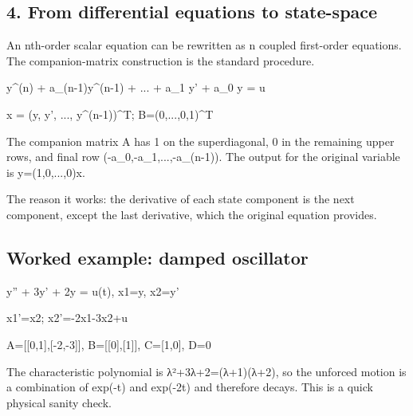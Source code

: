 \documentclass[11pt,a4paper]{article}
\begin{document}
\subsection{4. From differential equations to state-space}
\begin{conceptbox}An nth-order scalar equation can be rewritten as n coupled first-order equations. The companion-matrix construction is the standard procedure.\end{conceptbox}
\begin{equationbox}\raggedright
{\ttfamily\small y\textasciicircum{}(n) + a\_(n-1)y\textasciicircum{}(n-1) + ... + a\_1 y' + a\_0 y = u}\par
\end{equationbox}
\begin{equationbox}\raggedright
{\ttfamily\small x = (y, y', ..., y\textasciicircum{}(n-1))\textasciicircum{}T; B=(0,...,0,1)\textasciicircum{}T}\par
\end{equationbox}
\begin{conceptbox}The companion matrix A has 1 on the superdiagonal, 0 in the remaining upper rows, and final row (-a\_0,-a\_1,...,-a\_(n-1)). The output for the original variable is y=(1,0,...,0)x.\end{conceptbox}
\begin{proofbox}The reason it works: the derivative of each state component is the next component, except the last derivative, which the original equation provides.\end{proofbox}

\subsection{Worked example: damped oscillator}
\begin{equationbox}\raggedright
{\ttfamily\small y'' + 3y' + 2y = u(t), x1=y, x2=y'}\par
\end{equationbox}
\begin{equationbox}\raggedright
{\ttfamily\small x1'=x2; x2'=-2x1-3x2+u}\par
\end{equationbox}
\begin{equationbox}\raggedright
{\ttfamily\small A=[[0,1],[-2,-3]], B=[[0],[1]], C=[1,0], D=0}\par
\end{equationbox}
\begin{conceptbox}The characteristic polynomial is λ²+3λ+2=(λ+1)(λ+2), so the unforced motion is a combination of exp(-t) and exp(-2t) and therefore decays. This is a quick physical sanity check.\end{conceptbox}
\end{document}
